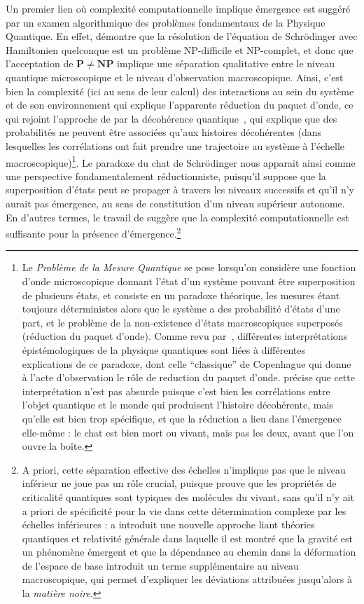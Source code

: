 Un premier lien où complexité computationnelle implique émergence est suggéré par un examen algorithmique des problèmes fondamentaux de la Physique Quantique. En effet, \cite{2014arXiv1403.7686B} démontre que la résolution de l'équation de Schrödinger avec Hamiltonien quelconque est un problème NP-difficile et NP-complet, et donc que l'acceptation de $\mathbf{P}\neq\mathbf{NP}$ implique une séparation qualitative entre le niveau quantique microscopique et le niveau d'observation macroscopique. Ainsi, c'est bien la complexité (ici au sens de leur calcul) des interactions au sein du système et de son environnement qui explique l'apparente réduction du paquet d'onde, ce qui rejoint l'approche de  par la décohérence quantique~\cite{gell1996quantum}, qui explique que des probabilités ne peuvent être associées qu'aux histoires décohérentes (dans lesquelles les corrélations ont fait prendre une trajectoire au système à l'échelle macroscopique)\footnote{Le \emph{Problème de la Mesure Quantique} se pose lorsqu'on considère une fonction d'onde microscopique donnant l'état d'un système pouvant être superposition de plusieurs états, et consiste en un paradoxe théorique, les mesures étant toujours déterministes alors que le système a des probabilité d'états d'une part, et le problème de la non-existence d'états macroscopiques superposés (réduction du paquet d'onde). Comme revu par~\cite{schlosshauer2005decoherence}, différentes interprétations épistémologiques de la physique quantiques sont liées à différentes explications de ce paradoxe, dont celle ``classique'' de Copenhague qui donne à l'acte d'observation le rôle de reduction du paquet d'onde.  précise que cette interprétation n'est pas absurde puisque c'est bien les corrélations entre l'objet quantique et le monde qui produisent l'histoire décohérente, mais qu'elle est bien trop spécifique, et que la réduction a lieu dans l'émergence elle-même : le chat est bien mort ou vivant, mais pas les deux, avant que l'on ouvre la boîte.}. Le paradoxe du chat de Schrödinger nous apparait ainsi comme une perspective fondamentalement réductionniste, puisqu'il suppose que la superposition d'états peut se propager à travers les niveaux successifs et qu'il n'y aurait pas émergence, au sens de constitution d'un niveau supérieur autonome. En d'autres termes, le travail de \cite{2014arXiv1403.7686B} suggère que la complexité computationnelle est suffisante pour la présence d'émergence.\footnote{A priori, cette séparation effective des échelles n'implique pas que le niveau inférieur ne joue pas un rôle crucial, puisque \cite{vattay2015quantum} prouve que les propriétés de criticalité quantiques sont typiques des molécules du vivant, sans qu'il n'y ait a priori de spécificité pour la vie dans cette détermination complexe par les échelles inférieures : \cite{2016arXiv161102269V} a introduit une nouvelle approche liant théories quantiques et relativité générale dans laquelle il est montré que la gravité est un phénomène émergent et que la dépendance au chemin dans la déformation de l'espace de base introduit un terme supplémentaire au niveau macroscopique, qui permet d'expliquer les déviations attribuées jusqu'alors à la \emph{matière noire}.}

